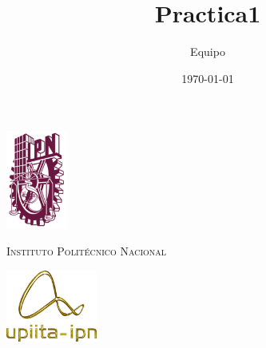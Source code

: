 \documentclass[12pt, letterpaper]{article}
\title{Practica1}
\author{Equipo}
\date{\today}
\begin{document}
    \begin{minipage}{2cm}
		\centering
		\includegraphics[width=2cm]{ipn-logo.png}

	\end{minipage}
	\hfill 
	\begin{minipage}{\linewidth-6cm}
		\centering
        \huge
		\textsc{Instituto Politécnico Nacional}
	\end{minipage}
	\hfill 
	\begin{minipage}{3cm}
		\centering
		\includegraphics[width=3cm]{upiita-logo.png}
	\end{minipage}
	
	\vspace{0.8cm}
	
\end{document}
